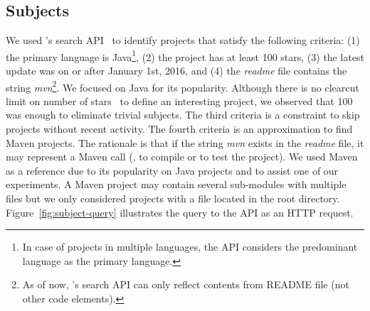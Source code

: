 

\subsection{Subjects}
\label{sec:subjects}



We used \github{}'s search API~\cite{githubsearch} to identify
projects that satisfy the following criteria: (1) the primary language
is Java\footnote{In case of projects in multiple languages, the
  \github{} API considers the predominant language as the primary
  language.}, (2) the project has at least 100 stars, (3) the latest
update was on or after January 1st, 2016, and (4) the \emph{readme}
file contains the string \emph{mvn}\footnote{As of now, \github{}'s
  search API can only reflect contents from README file (not other
  code elements).}.  We focused on Java for its popularity.  Although
there is no clearcut limit on number of \github{}
stars~\cite{github-stars} to define an interesting project, we
observed that 100 was enough to eliminate trivial subjects. The third
criteria is a constraint to skip projects without recent activity. The
fourth criteria is an approximation to find Maven projects. The
rationale is that if the string \emph{mvn} exists in the \emph{readme}
file, it may represent a Maven call (\eg, to compile or to test the
project). We used Maven as a reference due to its popularity on Java
projects and to assist one of our experiments. A Maven project may
contain several sub-modules with multiple \pomf{} files but we only
considered projects with a \pomf{} file located in the root directory.
Figure~\ref{fig:subject-query} illustrates the query to the \github{}
API as an HTTP request.

